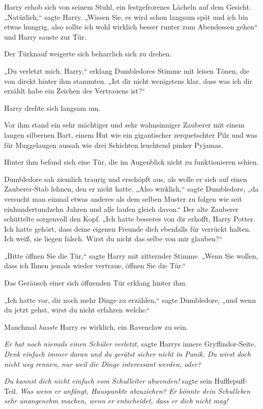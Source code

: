 {Harry erhob sich von seinem Stuhl, ein festgefrorenes Lächeln auf dem Gesicht. „Natürlich,“ sagte Harry. „Wissen Sie, es wird schon langsam spät und ich bin etwas hungrig, also sollte ich wohl wirklich besser runter zum Abendessen gehen“ und Harry sauste zur Tür.

Der Türknauf weigerte sich beharrlich sich zu drehen.

„Du verletzt mich, Harry,“ erklang Dumbledores Stimme mit leisen Tönen, die von direkt hinter ihm stammten. „Ist dir nicht wenigstens klar, dass was ich dir erzählt habe ein Zeichen des Vertrauens ist?“

Harry drehte sich langsam um.

Vor ihm stand ein sehr mächtiger und sehr wahnsinniger Zauberer mit einem langen silbernen Bart, einem Hut wie ein gigantischer zerquetschter Pilz und was für Muggelaugen aussah wie drei Schichten leuchtend pinker Pyjamas.

Hinter ihm befand sich eine Tür, die im Augenblick nicht zu funktionieren schien.

Dumbledore sah ziemlich traurig und erschöpft aus, als wolle er sich auf einen Zauberer-Stab lehnen, den er nicht hatte. „Also wirklich,“ sagte Dumbledore, „da versucht man einmal etwas anderes als dem selben Muster zu folgen wie seit einhundertundzehn Jahren und alle laufen gleich davon.“ Der alte Zauberer schüttelte sorgenvoll den Kopf. „Ich hatte besseres von dir erhofft, Harry Potter. Ich hatte gehört, dass deine eigenen Freunde dich ebenfalls für verrückt halten. Ich weiß, sie liegen falsch. Wirst du nicht das selbe von mir glauben?“

„Bitte öffnen Sie die Tür,“ sagte Harry mit zitternder Stimme. „Wenn Sie wollen, dass ich Ihnen jemals wieder vertraue, öffnen Sie die Tür.“

Das Geräusch einer sich öffnenden Tür erklang hinter ihm.

„Ich hatte vor, dir noch mehr Dinge zu erzählen,“ sagte Dumbledore, „und wenn du jetzt gehst, wirst du nicht erfahren welche.“

Manchmal \emph{hasste} Harry es wirklich, ein Ravenclaw zu sein.

\emph{Er hat noch niemals einen Schüler verletzt,} sagte Harrys innere Gryffindor-Seite. \emph{Denk einfach immer daran und du gerätst sicher nicht in Panik. Du wirst doch nicht weg rennen, nur weil die Dinge interessant werden, oder?}

\emph{Du kannst dich nicht einfach vom Schulleiter abwenden!} sagte sein Hufflepuff-Teil. \emph{Was wenn er anfängt, Hauspunkte abzuziehen? Er könnte dein Schulleben sehr unangenehm machen, wenn er entscheidet, dass er dich nicht mag!}

}
